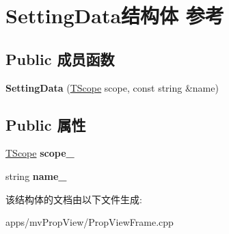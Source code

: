 \hypertarget{struct_setting_data}{\section{Setting\+Data结构体 参考}
\label{struct_setting_data}
}
\subsection*{Public 成员函数}
\begin{DoxyCompactItemize}
\item 
\hypertarget{struct_setting_data_ac93163c42d3e6cf4b3301dea074a592e}{{\bfseries Setting\+Data} (\hyperlink{group___common_interface_gae6cc8fec0123f239690564ecdeba4350}{T\+Scope} scope, const string \&name)}\label{struct_setting_data_ac93163c42d3e6cf4b3301dea074a592e}

\end{DoxyCompactItemize}
\subsection*{Public 属性}
\begin{DoxyCompactItemize}
\item 
\hypertarget{struct_setting_data_a84c10fc53b30eacae9b7988c8900cfa7}{\hyperlink{group___common_interface_gae6cc8fec0123f239690564ecdeba4350}{T\+Scope} {\bfseries scope\+\_\+}}\label{struct_setting_data_a84c10fc53b30eacae9b7988c8900cfa7}

\item 
\hypertarget{struct_setting_data_aaab8eb2fb354805bfd1758bdf34b227b}{string {\bfseries name\+\_\+}}\label{struct_setting_data_aaab8eb2fb354805bfd1758bdf34b227b}

\end{DoxyCompactItemize}


该结构体的文档由以下文件生成\+:\begin{DoxyCompactItemize}
\item 
apps/mv\+Prop\+View/Prop\+View\+Frame.\+cpp\end{DoxyCompactItemize}
